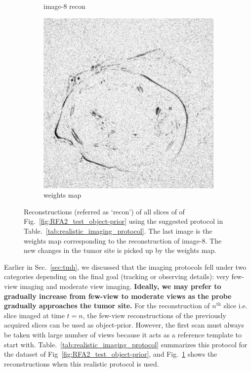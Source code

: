 \documentclass[journal]{IEEEtran}
\begin{document}
\begin{figure}[!h]
\begin{subfigure}[b]{0.24\linewidth}
\captionsetup{labelformat=empty}       
 \caption{image-8 recon}
    \end{subfigure}
       \begin{subfigure}[b]{0.24\linewidth}
        \includegraphics[width=\textwidth]{../images/tmh/RFA2/new_protocol/weightsIm_all_methods_kk_0_01.png}
\captionsetup{labelformat=empty}       
 \caption{weights map}
    \end{subfigure}
       \caption{Reconstructions (referred as `recon') of all slices of  of Fig.~\ref{fig:RFA2_test_object-prior} using the suggested protocol in Table.~\ref{tab:realistic_imaging_protocol}. The last image is the weights map corresponding to the reconstruction of image-8. The new changes in the tumor site is picked up by the weights map. }
\label{fig:RFA2_new_protocol}
\end{figure}

Earlier in Sec.~\ref{sec:tmh}, we discussed that the imaging protocols fell under two categories depending on the final goal (tracking or observing details): very few-view imaging and moderate view imaging. \textbf{Ideally, we may prefer to gradually increase from few-view to moderate views as the probe gradually approaches the tumor site.} For the reconstruction of $n^{\textrm{th}}$ slice i.e. slice imaged at time $t=n$, the few-view reconstructions of the previously acquired slices can be used as object-prior. However, the first scan must always be taken with large number of views because it acts as a reference template to start with. Table.~\ref{tab:realistic_imaging_protocol} summarizes this protocol for the dataset of Fig~\ref{fig:RFA2_test_object-prior}, and Fig.~\ref{fig:RFA2_new_protocol} shows the reconstructions when this realistic protocol is used.
\end{document}
